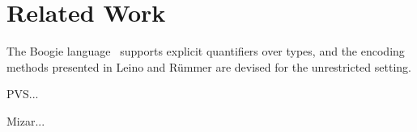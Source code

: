 \section{Related Work}
\label{sec_related_work}

The Boogie language~\cite{Barnett06boogie} supports explicit quantifiers over
types, and the encoding methods presented in Leino and R\"ummer
\cite{leino10tacas} are devised for the unrestricted setting.

PVS...

Mizar...
